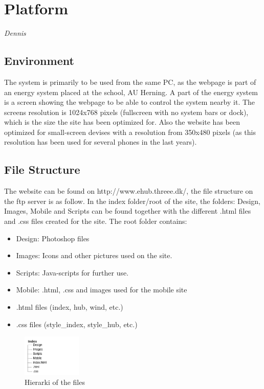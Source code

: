 \newpage
\chapter{Platform} \textit{Dennis}
\section{Environment}
The system is primarily to be used from the same PC, as the webpage is part of an energy system
placed at the school, AU Herning. A part of the energy system is a screen showing the webpage to
be able to control the system nearby it. The screens resolution is 1024x768 pixels (fullscreen with no system bars or dock), 
which is the size the site has been optimized for. Also the website has been optimized for small-screen devises with a resolution from 350x480 pixels (as this resolution has been used for several phones in the last years).
\section{File Structure}
The website can be found on http://www.ehub.threee.dk/, the file structure on the ftp server is as follow. In the index folder/root of the site, the folders: Design, Images, Mobile and Scripts can be found together with the different .html files and .css files created for the site. The root folder contains:
\begin{itemize}
	\item Design: Photoshop files
	\item Images: Icons and other pictures used on the site.
	\item Scripts: Java-scripts for further use.
	\item Mobile: .html, .css and images used for the mobile site
	\item .html files (index, hub, wind, etc.)
	\item .css files (style\_index, style\_hub, etc.)
\end{itemize}
\begin{figure}[htbp]
	\center
	\includegraphics[width=0.25\textwidth]{images/hierarki.png} %
   	\caption{Hierarki of the files}
   	\label{fig:file_hierarki}
\end{figure}
\newpage
